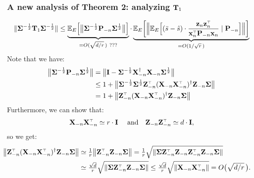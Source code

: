 \documentclass[10pt]{beamer}
\begin{document}
 \begin{frame}
   \frametitle{A new analysis of Theorem 2: analyzing $\mathbf{T}_1$}
   \begin{align*}
      \|\Sigmab^{-\frac12}\T_1 \Sigmab^{-\frac12}\| \leq
     \underbrace{\E_E\Big[\big\|\Sigmab^{-\frac12}\P_{-n}\Sigmab^{\frac12}\big\|\Big]}_{=O(\sqrt{d/r}\,) \ ???}
     \cdot
     \underbrace{\E_E\bigg[\Big\|\E_E\Big[(\bar s- \hat s)\cdot
     \frac{\z_n\z_n^\top}{\x_n^\top\P_{-n}\x_n}\mid
     \P_{-n}\Big]\Big\|\bigg]}_{=O(1/\sqrt r\,)} 
   \end{align*}
   Note that we have:
   \begin{align*}
     \big\|\Sigmab^{-\frac12}\P_{-n}\Sigmab^{\frac12}\big\|
     &= \big\|\I -
       \Sigmab^{-\frac12}\X_{-n}^\dagger\X_{-n}\Sigmab^{\frac12}\big\|
     \\
     &\leq 1 +
       \big\|\Sigmab^{-\frac12}\Sigmab^{\frac12}\Z_{-n}^\top(\X_{-n}\X_{-n}^\top)^{\dagger}\Z_{-n}\Sigmab\big\|
     \\
     &= 1 +
       \big\|\Z_{-n}^\top(\X_{-n}\X_{-n}^\top)^{\dagger}\Z_{-n}\Sigmab\big\|
   \end{align*}
Furthermore, we can show that:
\begin{align*}
  \X_{-n}\X_{-n}^\top\simeq r\cdot \I\
  \quad\text{and}\quad
  \Z_{-n}\Z_{-n}^\top \simeq d\cdot\I,
\end{align*}
so we get:
\begin{align*}
  \hspace{-5mm}\big\|\Z_{-n}^\top(\X_{-n}\X_{-n}^\top)^{\dagger}\Z_{-n}\Sigmab\big\|
  &\simeq \tfrac1{r}  \big\|\Z_{-n}^\top\Z_{-n}\Sigmab\big\|
= \tfrac1r \sqrt{\|\Sigmab
    \Z_{-n}^\top\Z_{-n}\Z_{-n}^\top\Z_{-n}\Sigmab\|}
  \\
  &\simeq \tfrac{\sqrt
    d}{r}\sqrt{\|\Sigmab\Z_{-n}^\top\Z_{-n}\Sigmab\|}
    \leq
    \tfrac{\sqrt d}{r}\sqrt{\|\X_{-n}\X_{-n}^\top\|}
    =
    O\big(\sqrt{d/r}\,\big).
  \end{align*}
\end{frame}
\end{document}
